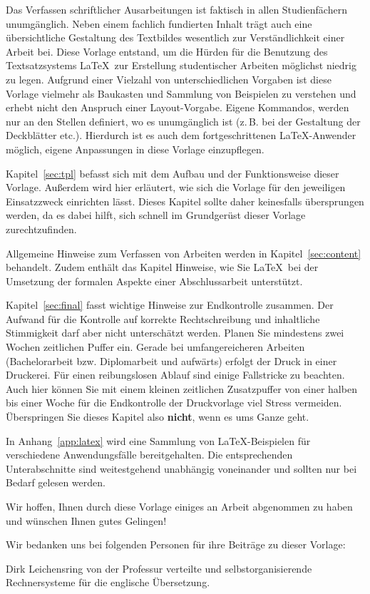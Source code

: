 Das Verfassen schriftlicher Ausarbeitungen ist faktisch in allen Studienfächern
unumgänglich. Neben einem fachlich fundierten Inhalt trägt auch eine
übersichtliche Gestaltung des Textbildes wesentlich zur Verständlichkeit einer
Arbeit bei. Diese Vorlage entstand, um die Hürden für die Benutzung des
Textsatzsystems \LaTeX\ zur Erstellung studentischer Arbeiten möglichst
niedrig zu legen. Aufgrund einer Vielzahl von unterschiedlichen Vorgaben ist
diese Vorlage vielmehr als Baukasten und Sammlung von Beispielen zu verstehen
und erhebt nicht den Anspruch einer Layout-Vorgabe. Eigene Kommandos, werden nur
an den Stellen definiert, wo es unumgänglich ist (z.\,B. bei der Gestaltung der
Deckblätter etc.). Hierdurch ist es auch dem fortgeschrittenen
\LaTeX-Anwender möglich, eigene Anpassungen in diese Vorlage einzupflegen.

Kapitel~\ref{sec:tpl} befasst sich mit dem Aufbau und der Funktionsweise dieser
Vorlage. Außerdem wird hier erläutert, wie sich die Vorlage für den jeweiligen
Einsatzzweck einrichten lässt. Dieses Kapitel sollte daher keinesfalls
übersprungen werden, da es dabei hilft, sich schnell im Grundgerüst dieser
Vorlage zurechtzufinden.

Allgemeine Hinweise zum Verfassen von Arbeiten werden in Kapitel~\ref{sec:content}
behandelt. Zudem enthält das Kapitel Hinweise, wie Sie \LaTeX\ bei der
Umsetzung der formalen Aspekte einer Abschlussarbeit unterstützt.

Kapitel~\ref{sec:final} fasst wichtige Hinweise zur Endkontrolle zusammen. Der
Aufwand für die Kontrolle auf korrekte Rechtschreibung und inhaltliche
Stimmigkeit darf aber nicht unterschätzt werden. Planen Sie mindestens zwei
Wochen zeitlichen Puffer ein. Gerade bei umfangereicheren Arbeiten
(Bachelorarbeit bzw. Diplomarbeit und aufwärts) erfolgt der Druck in einer
Druckerei. Für einen reibungslosen Ablauf sind einige Fallstricke zu beachten.
Auch hier können Sie mit einem kleinen zeitlichen Zusatzpuffer von einer halben
bis einer Woche für die Endkontrolle der Druckvorlage viel Stress vermeiden.
Überspringen Sie dieses Kapitel also \textbf{nicht}, wenn es ums Ganze geht.

In Anhang~\ref{app:latex} wird eine Sammlung von \LaTeX-Beispielen für
verschiedene Anwendungsfälle bereitgehalten. Die entsprechenden Unterabschnitte
sind weitestgehend unabhängig voneinander und sollten nur bei Bedarf gelesen
werden.

Wir hoffen, Ihnen durch diese Vorlage einiges an Arbeit abgenommen zu haben und
wünschen Ihnen gutes Gelingen!

\newpage

Wir bedanken uns bei folgenden Personen für ihre Beiträge zu dieser Vorlage:

\begin{compactitem}
\item Dirk Leichensring von der Professur verteilte und selbstorganisierende
      Rechnersysteme für die englische Übersetzung.
\end{compactitem}
